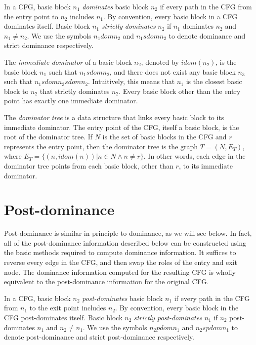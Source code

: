 In a CFG, basic block $n_{1}$ \emph{dominates} basic block $n_{2}$
if every path in the CFG from the entry point to $n_{2}$ includes
$n_{1}$. By convention, every basic block in a CFG dominates itself. Basic 
block $n_{1}$ \emph{strictly dominates} $n_{2}$ if $n_{1}$ dominates
$n_{2}$ and $n_{1} \neq n_{2}$. We use the symbols $n_{1} dom n_{2}$
and $n_{1} sdom n_{2}$ to denote dominance and strict dominance 
respectively.

The \emph{immediate dominator} of a basic block $n_{2}$, denoted by
$idom(n_{2})$, is the basic block $n_{1}$ such that $n_{1} sdom n_{2}$, and
there does not exist any basic block $n_{3}$ such that 
$n_{1} sdom n_{3} sdom n_{2}$. Intuitively, this means that $n_{1}$ is the
closest basic block to $n_{2}$ that strictly dominates $n_{2}$. 
Every basic block other than the entry point has exactly one immediate 
dominator. 

The \emph{dominator tree} is a data structure that links every basic block
to its immediate dominator. The entry point of the CFG, itself a basic block,
is the root of the dominator tree. If $N$ is the set of basic blocks in 
the CFG and $r$ represents the entry point, then the
dominator tree is the graph $T = (N, E_{T})$, where 
$E_{T} = \{(n, idom(n))| n \in N \wedge n \neq r \}$. In other words,
each edge in the dominator tree points from each basic block, other than $r$,
to its immediate dominator. 

\section{Post-dominance}

Post-dominance is similar in principle to dominance, as we will see below.
In fact, all of the post-dominance information described below can be 
constructed using the basic methods required to compute dominance 
information. It suffices to reverse every edge in the CFG, and then
swap the roles of the entry and exit node. The dominance information
computed for the resulting CFG is wholly equivalent to the post-dominance
information for the original CFG. 

In a CFG, basic block $n_{2}$ \emph{post-dominates} basic block $n_{1}$
if every path in the CFG from $n_{1}$ to the exit point includes
$n_{2}$. By convention, every basic block in the CFG post-dominates itself. 
Basic block $n_{2}$ \emph{strictly post-dominates} $n_{1}$ if $n_{2}$ 
post-dominates $n_{1}$ and $n_{2} \neq n_{1}$. We use the symbols 
$n_{2} pdom n_{1}$ and $n_{2} spdom n_{1}$ to denote post-dominance and 
strict post-dominance respectively.

